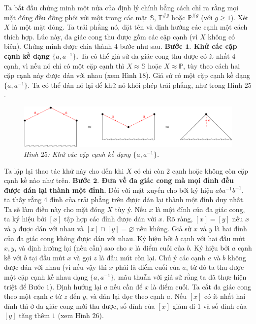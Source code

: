 \begin{multicols}{2}
	\vskip 0.1cm
	Ta bắt đầu chứng minh một nửa của định lý chính bằng cách chỉ ra rằng mọi mặt đóng đều đồng phôi với một trong các mặt $\mathbb{S}$, $\mathbb{T}^{\#g}$ hoặc $\mathbb{P}^{\#g}$ (với $g \ge 1$). Xét $X$ là một mặt đóng. Ta trải phẳng nó, đặt tên và định hướng các cạnh một cách thích hợp. Lúc này, đa giác cong thu được gồm các cặp cạnh (vì $X$ không có biên). Chứng minh được chia thành $4$ bước như sau.
	\vskip 0.1cm
	{\bf\color{duongvaotoanhoc} Bước $\pmb{1.}$ Khử các cặp cạnh kề dạng $\{a,a^{-1}\}$.} Ta có thể giả sử đa giác cong thu được có ít nhất $4$ cạnh, vì nếu nó chỉ có một cặp cạnh thì $X \approx \mathbb{S}$ hoặc $X \approx \mathbb{P}$, tùy theo cách hai cặp cạnh này được dán với nhau (xem Hình $18$). Giả sử có một cặp cạnh kề dạng $\{a,a^{-1}\}$. Ta có thể dán nó lại để khử nó khỏi phép trải phẳng, như trong Hình $25$.
	\begin{figure}[H]
		\vspace*{-5pt}
		\centering\captionsetup{labelformat=empty, justification=centering}
		\includegraphics[width=1\linewidth]{H25.pdf}
		\caption{\small\textit{\color{duongvaotoanhoc}Hình $25$: Khử các cặp cạnh kề dạng $\{a,a^{-1}\}$.}}
		\vspace*{-10pt}
	\end{figure}
	Ta lặp lại thao tác khử này cho đến khi $X$ có chỉ còn $2$ cạnh hoặc không còn cặp cạnh kề nào như trên.
	\vskip 0.1cm
	{\bf\color{duongvaotoanhoc} Bước $\pmb{2.}$ Đưa về đa giác cong mà mọi đỉnh đều được dán lại thành một đỉnh.} Đối với mặt xuyến cho bởi ký hiệu $aba^{-1}b^{-1}$, ta thấy rằng $4$ đỉnh của trải phẳng trên được dán lại thành một đỉnh duy nhất. Ta sẽ làm điều này cho mặt đóng $X$ tùy ý. Nếu $x$ là một đỉnh của đa giác cong, ta ký hiệu bởi $[x]$ tập hợp các đỉnh được dán với $x$. Rõ ràng, $[x] = [y]$ nếu $x$ và $y$ được dán với nhau và $[x] \cap [y] = \varnothing$ nếu không.
	\vskip 0.1cm
	Giả sử $x$ và $y$ là hai đỉnh của đa giác cong không được dán với nhau. Ký hiệu bởi $b$ cạnh với hai đầu mút $x,y$, và định hướng lại (nếu cần) sao cho $x$ là điểm cuối của $b$. Ký hiệu bởi $a$ cạnh kề với $b$ tại đầu mút $x$ và gọi $z$ là đầu mút còn lại. Chú ý các cạnh $a$ và $b$ không được dán với nhau (vì nếu vậy thì $x$ phải là điểm cuối của $a$, từ đó ta thu được một cặp cạnh kề nhau dạng $\{a,a^{-1}\}$, mâu thuẫn với giả sử rằng ta đã thực hiện triệt để Bước $1$). Định hướng lại $a$ nếu cần để $x$ là điểm cuối. Ta cắt đa giác cong theo một cạnh $c$ từ $z$ đến $y$, và dán lại dọc theo cạnh $a$. Nếu $[x]$ có ít nhất hai đỉnh thì ở đa giác cong mới thu được, số đỉnh của $[x]$ giảm đi $1$ và số đỉnh của $[y]$ tăng thêm $1$ (xem Hình $26$).

\end{multicols}

